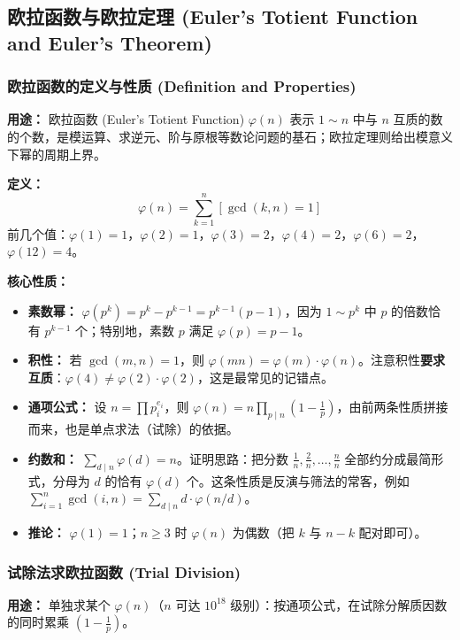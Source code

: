 \subsection{欧拉函数与欧拉定理 (Euler's Totient Function and Euler's Theorem)}

\subsubsection{欧拉函数的定义与性质 (Definition and Properties)}

\textbf{用途：}
欧拉函数 (Euler's Totient Function) $\varphi(n)$ 表示 $1 \sim n$ 中与 $n$ 互质的数的个数，是模运算、求逆元、阶与原根等数论问题的基石；欧拉定理则给出模意义下幂的周期上界。

\textbf{定义：}
\[
\varphi(n) = \sum_{k=1}^{n} [\gcd(k, n) = 1]
\]
前几个值：$\varphi(1) = 1$，$\varphi(2) = 1$，$\varphi(3) = 2$，$\varphi(4) = 2$，$\varphi(6) = 2$，$\varphi(12) = 4$。

\textbf{核心性质：}
\begin{itemize}
    \item \textbf{素数幂：} $\varphi(p^{k}) = p^{k} - p^{k-1} = p^{k-1}(p-1)$，因为 $1 \sim p^{k}$ 中 $p$ 的倍数恰有 $p^{k-1}$ 个；特别地，素数 $p$ 满足 $\varphi(p) = p - 1$。
    \item \textbf{积性：} 若 $\gcd(m, n) = 1$，则 $\varphi(mn) = \varphi(m) \cdot \varphi(n)$。注意积性\textbf{要求互质}：$\varphi(4) \neq \varphi(2) \cdot \varphi(2)$，这是最常见的记错点。
    \item \textbf{通项公式：} 设 $n = \prod p_i^{e_i}$，则 $\varphi(n) = n \prod_{p \mid n} \left(1 - \frac{1}{p}\right)$，由前两条性质拼接而来，也是单点求法（试除）的依据。
    \item \textbf{约数和：} $\sum_{d \mid n} \varphi(d) = n$。证明思路：把分数 $\frac{1}{n}, \frac{2}{n}, \dots, \frac{n}{n}$ 全部约分成最简形式，分母为 $d$ 的恰有 $\varphi(d)$ 个。这条性质是反演与筛法的常客，例如 $\sum_{i=1}^{n} \gcd(i, n) = \sum_{d \mid n} d \cdot \varphi(n/d)$。
    \item \textbf{推论：} $\varphi(1) = 1$；$n \ge 3$ 时 $\varphi(n)$ 为偶数（把 $k$ 与 $n-k$ 配对即可）。
\end{itemize}

\subsubsection{试除法求欧拉函数 (Trial Division)}

\textbf{用途：}
单独求某个 $\varphi(n)$（$n$ 可达 $10^{18}$ 级别）：按通项公式，在试除分解质因数的同时累乘 $\left(1 - \frac{1}{p}\right)$。

